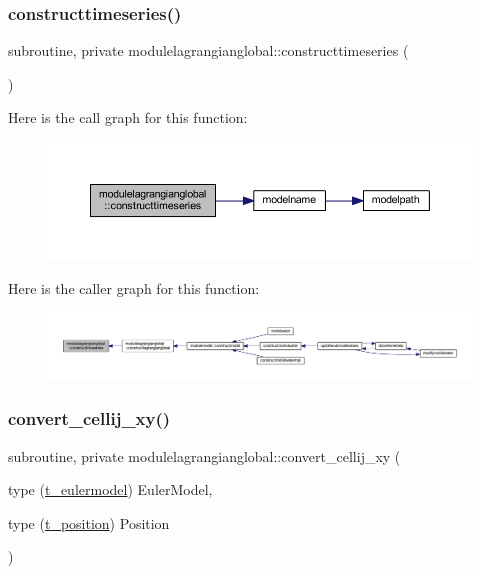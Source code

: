 \subsubsection{\texorpdfstring{constructtimeseries()}{constructtimeseries()}}
{\footnotesize\ttfamily subroutine, private modulelagrangianglobal\+::constructtimeseries (\begin{DoxyParamCaption}{ }\end{DoxyParamCaption})\hspace{0.3cm}{\ttfamily [private]}}

Here is the call graph for this function\+:\nopagebreak
\begin{figure}[H]
\begin{center}
\leavevmode
\includegraphics[width=350pt]{namespacemodulelagrangianglobal_ace8bf8bfcb4ec7384b2bb7af77034f8e_cgraph}
\end{center}
\end{figure}
Here is the caller graph for this function\+:\nopagebreak
\begin{figure}[H]
\begin{center}
\leavevmode
\includegraphics[width=350pt]{namespacemodulelagrangianglobal_ace8bf8bfcb4ec7384b2bb7af77034f8e_icgraph}
\end{center}
\end{figure}
\mbox{\label{namespacemodulelagrangianglobal_a7c1bdff13dafe0f3f6c8cd12a1398401}} 
\subsubsection{\texorpdfstring{convert\+\_\+cellij\+\_\+xy()}{convert\_cellij\_xy()}}
{\footnotesize\ttfamily subroutine, private modulelagrangianglobal\+::convert\+\_\+cellij\+\_\+xy (\begin{DoxyParamCaption}\item[{type (\mbox{\hyperlink{structmodulelagrangianglobal_1_1t__eulermodel}{t\+\_\+eulermodel}})}]{Euler\+Model,  }\item[{type (\mbox{\hyperlink{structmodulelagrangianglobal_1_1t__position}{t\+\_\+position}})}]{Position }\end{DoxyParamCaption})\hspace{0.3cm}{\ttfamily [private]}}


